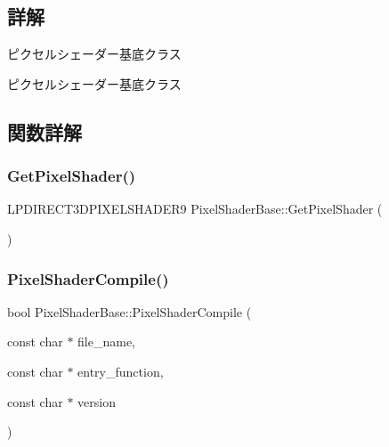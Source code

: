 \subsection{詳解}
ピクセルシェーダー基底クラス 

ピクセルシェーダー基底クラス 

\subsection{関数詳解}
\mbox{\label{class_pixel_shader_base_a936a4a1e99488854ffdd4cc245134481}} 
\subsubsection{\texorpdfstring{Get\+Pixel\+Shader()}{GetPixelShader()}}
{\footnotesize\ttfamily L\+P\+D\+I\+R\+E\+C\+T3\+D\+P\+I\+X\+E\+L\+S\+H\+A\+D\+E\+R9 Pixel\+Shader\+Base\+::\+Get\+Pixel\+Shader (\begin{DoxyParamCaption}{ }\end{DoxyParamCaption})\hspace{0.3cm}{\ttfamily [inline]}}

\mbox{\label{class_pixel_shader_base_ac572f1cb13a4486fc8bc2e60e5a14dc4}} 
\subsubsection{\texorpdfstring{Pixel\+Shader\+Compile()}{PixelShaderCompile()}}
{\footnotesize\ttfamily bool Pixel\+Shader\+Base\+::\+Pixel\+Shader\+Compile (\begin{DoxyParamCaption}\item[{const char $\ast$}]{file\+\_\+name,  }\item[{const char $\ast$}]{entry\+\_\+function,  }\item[{const char $\ast$}]{version }\end{DoxyParamCaption})\hspace{0.3cm}{\ttfamily [inline]}}




